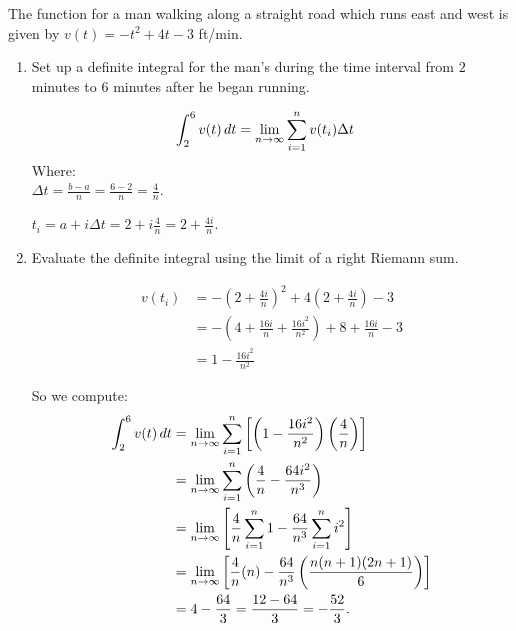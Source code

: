 \documentclass[ nooutcomes]{ximera}
\begin{document}
\begin{problem}
  The  function for a man walking along a straight road which runs east and west is given by $v(t) = -t^2 + 4t - 3$ ft/min.
  \begin{enumerate}
    
  \item  Set up a definite integral for the man's  during the time interval from $2$ minutes to $6$ minutes after he began running.
    \begin{freeResponse}
      \begin{align*}
        \int_2^6 v(t) \d t &= \lim_{n \to \infty} \sum_{i=1}^n v(t_i) \Delta t
      \end{align*}
      Where:  \\	
      $\Delta t = \frac{b-a}{n} = \frac{6-2}{n} = \frac{4}{n}$.
      
      $t_i = a + i \Delta t = 2 + i \frac{4}{n} = 2 + \frac{4i}{n}$.
    \end{freeResponse}
    
  \item  {}  Evaluate the definite integral using the limit of a right Riemann sum.
    \begin{freeResponse}
      \begin{align*}
        v(t_i) &= -\left(2 + \frac{4i}{n} \right)^2 + 4 \left( 2 + \frac{4i}{n} \right) - 3  \\
               &= - \left( 4 + \frac{16i}{n} + \frac{16i^2}{n^2} \right) + 8 + \frac{16i}{n} - 3  \\
               &= 1 - \frac{16i^2}{n^2}
      \end{align*}
      
      So we compute:
      \begin{align*}
        \int_2^6 v(t) \d t &= \lim_{n \to \infty} \sum_{i=1}^n \left[ \left( 1 - \frac{16i^2}{n^2} \right) \left( \frac{4}{n} \right) \right]  \\
                           &= \lim_{n \to \infty} \sum_{i=1}^n \left( \frac{4}{n} - \frac{64 i^2}{n^3} \right)  \\
                           &= \lim_{n \to \infty} \left[ \frac{4}{n} \sum_{i=1}^n 1 - \frac{64}{n^3} \sum_{i=1}^n i^2 \right]  \\
                           &= \lim_{n \to \infty} \left[ \frac{4}{n} (n) - \frac{64}{n^3} \left( \frac{n(n+1)(2n+1)}{6} \right) \right]  \\
                           &= 4 - \frac{64}{3} = \frac{12-64}{3} = - \frac{52}{3}.
      \end{align*}
    \end{freeResponse}
    

\end{enumerate}
\end{problem}
\end{document}
